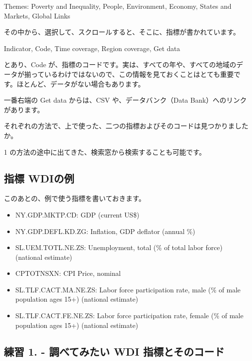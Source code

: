 \documentclass[
  xelatex, ja=standard]{bxjsbook}
\providecommand{\tightlist}{%
  \setlength{\itemsep}{0pt}\setlength{\parskip}{0pt}}
\theoremstyle{definition}
\theoremstyle{definition}
\theoremstyle{definition}
\theoremstyle{definition}
\theoremstyle{remark}
\begin{document}
Themes: Poverty and Inequality, People, Environment, Economy, States and Markets, Global Links

その中から、選択して、スクロールすると、そこに、指標が書かれています。

Indicator, Code, Time coverage, Region coverage, Get data

とあり、Code が、指標のコードです。実は、すべての年や、すべての地域のデータが揃っているわけではないので、この情報を見ておくことはとても重要です。ほとんど、データがない場合もあります。

一番右端の Get data からは、CSV や、データバンク（Data Bank）へのリンクがあります。

それぞれの方法で、上で使った、二つの指標およびそのコードは見つかりましたか。

1 の方法の途中に出てきた、検索窓から検索することも可能です。

\hypertarget{ux6307ux6a19-wdiux306eux4f8b}{%
\subsection{指標 WDIの例}\label{ux6307ux6a19-wdiux306eux4f8b}}

このあとの、例で使う指標を書いておきます。

\begin{itemize}
\tightlist
\item
  NY.GDP.MKTP.CD: GDP (current US\$)
\item
  NY.GDP.DEFL.KD.ZG: Inflation, GDP deflator (annual \%)
\item
  SL.UEM.TOTL.NE.ZS: Unemployment, total (\% of total labor force) (national estimate)
\item
  CPTOTNSXN: CPI Price, nominal
\item
  SL.TLF.CACT.MA.NE.ZS: Labor force participation rate, male (\% of male population ages 15+) (national estimate)
\item
  SL.TLF.CACT.FE.NE.ZS: Labor force participation rate, female (\% of male population ages 15+) (national estimate)
\end{itemize}

\hypertarget{ux7df4ux7fd2-1.---ux8abfux3079ux3066ux307fux305fux3044-wdi-ux6307ux6a19ux3068ux305dux306eux30b3ux30fcux30c9}{%
\subsection{練習 1. - 調べてみたい WDI 指標とそのコード}\label{ux7df4ux7fd2-1.---ux8abfux3079ux3066ux307fux305fux3044-wdi-ux6307ux6a19ux3068ux305dux306eux30b3ux30fcux30c9}}
\end{document}
